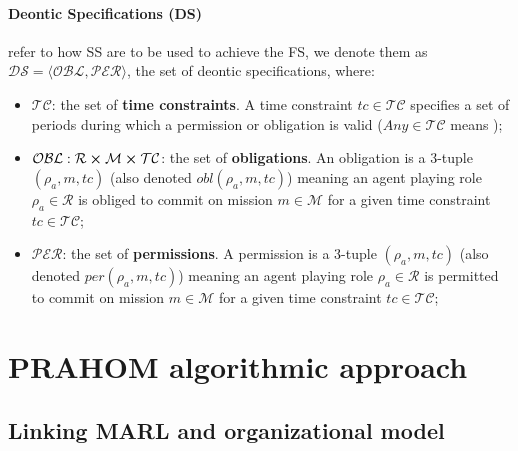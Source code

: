 \documentclass[runningheads]{llncs}
\begin{document}
\paragraph{\textbf{Deontic Specifications (DS)}} refer to how SS are to be used to achieve the FS, we denote them as $\mathcal{DS} = \langle \mathcal{OBL},\mathcal{PER} \rangle$, the set of deontic specifications, where:

\begin{itemize}
    \item $\mathcal{TC}$: the set of \textbf{time constraints}. A time constraint $tc \in \mathcal{TC}$ specifies a set of periods during which a permission or obligation is valid ($Any \in \mathcal{TC}$ means );
    \item $\mathcal{OBL}: \mathcal{R} \cross \mathcal{M} \cross \mathcal{TC}$: the set of \textbf{obligations}. An obligation is a 3-tuple $(\rho_a,m,tc)$ (also denoted $obl(\rho_a,m,tc)$) meaning an agent playing role $\rho_a \in \mathcal{R}$ is obliged to commit on mission $m \in \mathcal{M}$ for a given time constraint $tc \in \mathcal{TC}$;
    \item $\mathcal{PER}$: the set of \textbf{permissions}. A permission is a 3-tuple $(\rho_a,m,tc)$ (also denoted $per(\rho_a,m,tc)$) meaning an agent playing role $\rho_a \in \mathcal{R}$ is permitted to commit on mission $m \in \mathcal{M}$ for a given time constraint $tc \in \mathcal{TC}$;
\end{itemize}



\section{PRAHOM algorithmic approach}

\subsection{Linking MARL and organizational model}
\end{document}
